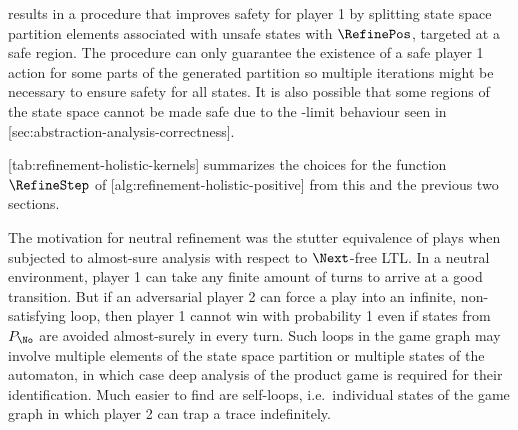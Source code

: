     results in a procedure that improves safety for player 1 by splitting state space partition elements associated with unsafe states with $\RefinePos$, targeted at a safe region.
    The procedure can only guarantee the existence of a safe player 1 action for some parts of the generated partition so multiple iterations might be necessary to ensure safety for all states.
    It is also possible that some regions of the state space cannot be made safe due to the \epsilon-limit behaviour seen in [sec:abstraction-analysis-correctness].

    [tab:refinement-holistic-kernels] summarizes the choices for the function $\RefineStep$ of [alg:refinement-holistic-positive] from this and the previous two sections.

\stopsubsection


    \startalgorithmic[numbering=no,margin=0em]
    \stopalgorithmic
    \startalgorithmic
                \ENDIF
            \ENDIF
        \ENDFOR
    \stopalgorithmic
\stopbuffer

\startsubsection[title={Loop Removal},reference={sec:refinement-holistic-loops}]

    The motivation for neutral refinement was the stutter equivalence of plays when subjected to almost-sure analysis with respect to $\Next$-free LTL.
    In a neutral environment, player 1 can take any finite amount of turns to arrive at a good transition.
    But if an adversarial player 2 can force a play into an infinite, non-satisfying loop, then player 1 cannot win with probability 1 even if states from $P_\No$ are avoided almost-surely in every turn.
    Such loops in the game graph may involve multiple elements of the state space partition or multiple states of the automaton, in which case deep analysis of the product game is required for their identification.
    Much easier to find are self-loops, i.e.\ individual states of the game graph in which player 2 can trap a trace indefinitely.

